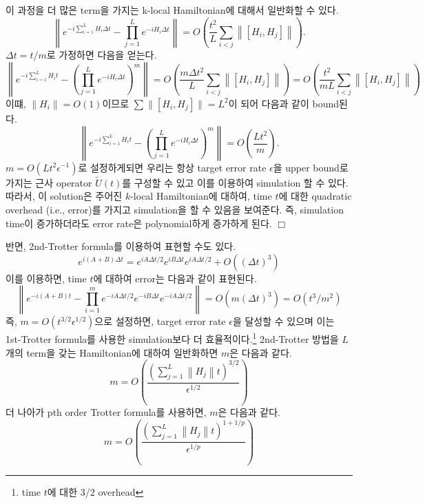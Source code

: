 이 과정을 더 많은 term을 가지는 k-local Hamiltonian에 대해서 일반화할 수 있다.
\begin{equation*}
  \left\|e^{-i \sum_{i=1}^L H_i \Delta t}-\prod_{j=1}^L e^{-i H_i \Delta t}\right\|=O\left(\frac{t^2}{L} \sum_{i<j}\left\|\left[H_i, H_j\right]\right\|\right) .
\end{equation*}
\newpage
$\Delta t = t/m$로 가정하면 다음을 얻는다.
\begin{equation*}
\left\|e^{-i \sum_{i=1}^L H_i t}-\left(\prod_{j=1}^L e^{-i H_i \Delta t}\right)^m\right\|=O\left(\frac{m \Delta t^2}{L} \sum_{i<j}\left\|\left[H_i, H_j\right]\right\|\right)=O\left(\frac{t^2}{m L} \sum_{i<j}\left\|\left[H_i, H_j\right]\right\|\right)
\end{equation*}
이떄, $\|H_i\| = O(1)$이므로 $\sum \|[H_i, H_j]\| = L^2$이 되어 다음과 같이 bound된다.
\begin{equation*}
\left\|e^{-i \sum_{i=1}^L H_i t}-\left(\prod_{j=1}^L e^{-i H_i \Delta t}\right)^m\right\|=O\left(\frac{L t^2}{m}\right) .
\end{equation*}
$m=O(Lt^2 \epsilon^{-1})$로 설정하게되면 우리는 항상 target error rate $\epsilon$을 upper bound로 가지는 근사 operator $\tilde U(t)$를 구성할 수 있고 이를 이용하여 simulation 할 수 있다.
따라서, 이 solution은 주어진 $k$-local Hamiltonian에 대하여, time $t$에 대한 quadratic overhead (i.e., error)를 가지고 simulation을 할 수 있음을 보여준다. 즉, simulation time이 증가하더라도 error rate은 polynomial하게 증가하게 된다. $\Box$

\vspace{1em}

반면, 2nd-Trotter formula를 이용하여 표현할 수도 있다. 
\begin{equation*}
  e^{i(A+B) \Delta t}=e^{i A \Delta t / 2} e^{i B \Delta t} e^{i A \Delta t / 2}+O\left((\Delta t)^3\right) 
  \end{equation*}
이를 이용하면, time $t$에 대하여 error는 다음과 같이 표현된다.
\begin{equation*}
  \left\|e^{-i(A+B) t}-\prod_{i=1}^m e^{-i A \Delta t / 2} e^{-i B \Delta t} e^{-i A \Delta t / 2}\right\|=O\left(m(\Delta t)^3\right)=O\left(t^3 / m^2\right)
  \end{equation*}
즉, $m = O(t^{3/2}\epsilon^{1/2})$으로 설정하면, target error rate $\epsilon$을 달성할 수 있으며 이는 1st-Trotter formula를 사용한 simulation보다 더 효율적이다.\footnote{time $t$에 대한 3/2 overhead}
2nd-Trotter 방법을 $L$개의 term을 갖는 Hamiltonian에 대하여 일반화하면 $m$은 다음과 같다.
\begin{equation*}
  m=O\left(\frac{\left(\sum_{j=1}^L\left\|H_j\right\| t\right)^{3 / 2}}{\epsilon^{1 / 2}}\right)
  \end{equation*}
더 나아가 pth order Trotter formula를 사용하면, $m$은 다음과 같다.
\begin{equation*}
  m=O\left(\frac{\left(\sum_{j=1}^L\left\|H_j\right\| t\right)^{1+1 / p}}{\epsilon^{1 / p}}\right)
  \end{equation*}

